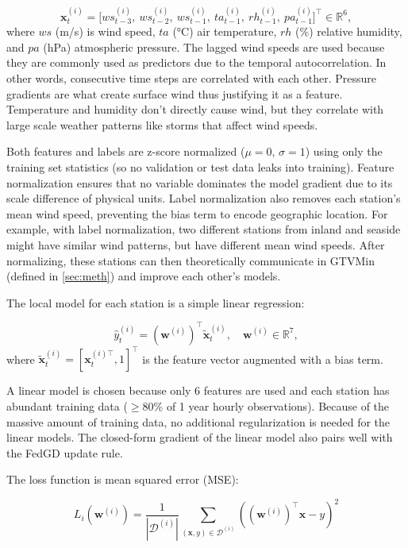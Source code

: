 \documentclass{article}
\begin{document}
$$
	\mathbf{x}^{(i)}_t = \bigl[ws^{(i)}_{t-3},\ ws^{(i)}_{t-2},\ ws^{(i)}_{t-1},\ ta^{(i)}_{t-1},\ rh^{(i)}_{t-1},\ pa^{(i)}_{t-1}\bigr]^\top \in \mathbb{R}^6,
$$
where $ws$ (m/s) is wind speed, $ta$ (°C) air temperature, $rh$ (\%) relative
humidity, and $pa$ (hPa) atmospheric pressure. The lagged wind speeds are used
because they are commonly used as predictors due to the temporal autocorrelation.
In other words, consecutive time steps are correlated with each other. Pressure
gradients are what create surface wind thus justifying it as a feature. Temperature
and humidity don't directly cause wind, but they correlate with large scale weather
patterns like storms that affect wind speeds.

Both features and labels are z-score normalized ($\mu = 0$, $\sigma = 1$) using only
the training set statistics (so no validation or test data leaks into training). Feature normalization
ensures that no variable dominates the model gradient due to its scale difference
of physical units. Label normalization also removes each station's mean wind speed,
preventing the bias term to encode geographic location. For example, with label normalization,
two different stations from inland and seaside might have similar wind patterns, but
have different mean wind speeds. After normalizing, these stations can then theoretically
communicate in GTVMin \cite{SarcheshmehPour2023} (defined in \cref{sec:meth}) and improve each other's models.

The local model for each station is a simple linear regression:

$$
	\hat{y}^{(i)}_t = (\mathbf{w}^{(i)})^\top \tilde{\mathbf{x}}^{(i)}_t, \quad \mathbf{w}^{(i)} \in \mathbb{R}^7,
$$
where $\tilde{\mathbf{x}}^{(i)}_t = [\mathbf{x}^{(i)\top}_t, 1]^\top$ is the feature vector augmented with a bias term.

A linear model is chosen because only 6 features are used and each station
has abundant training data ($\geq 80\%$ of 1 year hourly observations). Because of
the massive amount of training data, no additional regularization is needed for
the linear models. The closed-form gradient of the linear model also pairs well
with the FedGD update rule.

The loss function is mean squared error (MSE):

\begin{equation}
	L_i(\mathbf{w}^{(i)}) = \frac{1}{|\mathcal{D}^{(i)}|} \sum_{(\mathbf{x}, y) \in \mathcal{D}^{(i)}} \left( (\mathbf{w}^{(i)})^\top \mathbf{x} - y \right)^2
	\label{eq:mse}
\end{equation}
\end{document}
